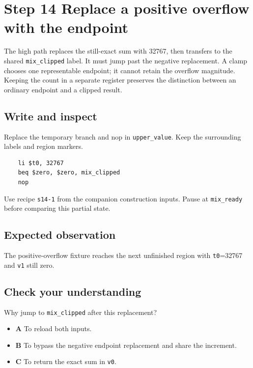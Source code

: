 \section{Step 14 Replace a positive overflow with the endpoint}\label{pcm-s14}

The high path replaces the still-exact sum with 32767, then transfers to the shared \texttt{mix\_clipped} label. It must jump past the negative replacement. A clamp chooses one representable endpoint; it cannot retain the overflow magnitude. Keeping the count in a separate register preserves the distinction between an ordinary endpoint and a clipped result.

\subsection{Write and inspect}
Replace the temporary branch and nop in \texttt{upper\_value}. Keep the surrounding labels and region markers.

\begin{verbatim}
    li $t0, 32767
    beq $zero, $zero, mix_clipped
    nop
\end{verbatim}
Use recipe \texttt{s14-1} from the companion construction inputs. Pause at \texttt{mix\_ready} before comparing this partial state.

\subsection{Expected observation}
The positive-overflow fixture reaches the next unfinished region with \texttt{t0}=32767 and \texttt{v1} still zero.

\subsection{Check your understanding}
Why jump to \texttt{mix\_clipped} after this replacement?

\begin{itemize}
\item \textbf{A} To reload both inputs.
\item \textbf{B} To bypass the negative endpoint replacement and share the increment.
\item \textbf{C} To return the exact sum in \texttt{v0}.
\end{itemize}
